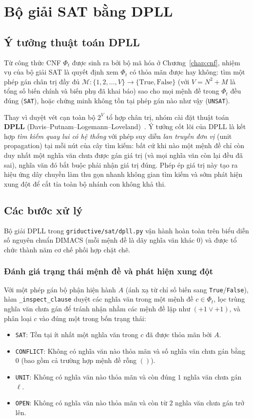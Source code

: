 \chapter{Bộ giải SAT bằng DPLL}
\label{chap:dpll}

\section{Ý tưởng thuật toán DPLL}
Từ công thức CNF $\Phi_t$ được sinh ra bởi bộ mã hóa ở Chương~\ref{chap:cnf}, nhiệm vụ của bộ giải SAT là quyết định xem $\Phi_t$ có thỏa mãn được hay không: tìm một phép gán chân trị đầy đủ $\mathcal{M}: \{1, 2, \dots, V\} \to \{\text{True}, \text{False}\}$ (với $V = N^2 + M$ là tổng số biến chính và biến phụ đã khai báo) sao cho mọi mệnh đề trong $\Phi_t$ đều đúng (\texttt{SAT}), hoặc chứng minh không tồn tại phép gán nào như vậy (\texttt{UNSAT}).

Thay vì duyệt vét cạn toàn bộ $2^V$ tổ hợp chân trị, nhóm cài đặt thuật toán \textbf{DPLL} (Davis--Putnam--Logemann--Loveland)~\cite{dpll1962,russell2020aima}. Ý tưởng cốt lõi của DPLL là kết hợp \textit{tìm kiếm quay lui có hệ thống} với phép suy diễn \textit{lan truyền đơn vị} (unit propagation) tại mỗi nút của cây tìm kiếm: bất cứ khi nào một mệnh đề chỉ còn duy nhất một nghĩa văn chưa được gán giá trị (và mọi nghĩa văn còn lại đều đã sai), nghĩa văn đó bắt buộc phải nhận giá trị đúng. Phép ép giá trị này tạo ra hiệu ứng dây chuyền làm thu gọn nhanh không gian tìm kiếm và sớm phát hiện xung đột để cắt tỉa toàn bộ nhánh con không khả thi.

\section{Các bước xử lý}
Bộ giải DPLL trong \texttt{griductive/sat/dpll.py} vận hành hoàn toàn trên biểu diễn số nguyên chuẩn DIMACS (mỗi mệnh đề là dãy nghĩa văn khác $0$) và được tổ chức thành năm cơ chế phối hợp chặt chẽ.

\subsection{Đánh giá trạng thái mệnh đề và phát hiện xung đột}
Với một phép gán bộ phận hiện hành $A$ (ánh xạ từ chỉ số biến sang \texttt{True}/\texttt{False}), hàm \texttt{\_inspect\_clause} duyệt các nghĩa văn trong một mệnh đề $c \in \Phi_t$, lọc trùng nghĩa văn chưa gán để tránh nhận nhầm các mệnh đề lặp như $(+1 \lor +1)$, và phân loại $c$ vào đúng một trong bốn trạng thái:
\begin{itemize}
    \item \texttt{SAT}: Tồn tại ít nhất một nghĩa văn trong $c$ đã được thỏa mãn bởi $A$.
    \item \texttt{CONFLICT}: Không có nghĩa văn nào thỏa mãn và số nghĩa văn chưa gán bằng $0$ (bao gồm cả trường hợp mệnh đề rỗng $()$).
    \item \texttt{UNIT}: Không có nghĩa văn nào thỏa mãn và còn đúng $1$ nghĩa văn chưa gán $\ell$.
    \item \texttt{OPEN}: Không có nghĩa văn nào thỏa mãn và còn từ $2$ nghĩa văn chưa gán trở lên.
\end{itemize}

